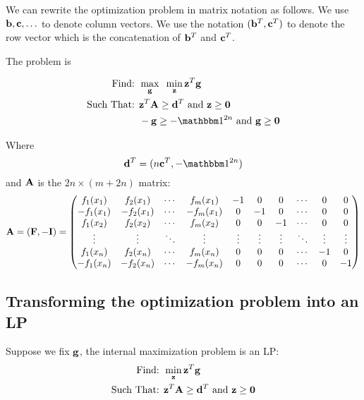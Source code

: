 \documentclass{article}[12pt]
\begin{document}
We can rewrite the optimization problem in matrix notation as follows.
We use $\mathbf{b},\mathbf{c},\ldots$ to denote column vectors.  We use the notation
$(\mathbf{b}^T,\mathbf{c}^T)$ to denote the row vector which is the concatenation of
$\mathbf{b}^T$ and $\mathbf{c}^T$.

The problem is

\begin{eqnarray}
\mbox{Find: }&\max_{\vg} \;\; \min_{\vz} \vz^T \vg \label{max-min-prog}\\
\mbox{Such That: }& \vz^T \vA \geq \vd^T \mbox{ and } \vz \geq \vzero
\notag \\
& -\vg \geq -\ones{2n} \mbox{ and } \vg \geq \vzero \notag
\end{eqnarray}

Where 
\begin{equation}
\vd^T = (n \vc^T, -\ones{2n})
\end{equation}
and $\mathbf{A}$ is the  $2n \times (m+2n)$ matrix: 
\begin{equation}
\mathbf{A} = \left( \mathbf{F}, -\mathbf{I} \right) =
 \begin{pmatrix}
   f_1(x_1) &  f_2(x_1) & \cdots &  f_m(x_1) & -1 & 0 & 0 & \cdots & 0
   & 0 \\
  -f_1(x_1) & -f_2(x_1) & \cdots & -f_m(x_1) & 0 & -1 & 0 & \cdots & 0
  & 0 \\
   f_1(x_2) &  f_2(x_2) & \cdots &  f_m(x_2) & 0 & 0 & -1 & \cdots & 0
   & 0 \\
  \vdots   & \vdots    & \ddots &  \vdots  & \vdots & \vdots & \vdots
  & \ddots & \vdots & \vdots \\
   f_1(x_n)  &  f_2(x_n)  & \cdots &   f_m(x_n) & 0  & 0 & 0 & \cdots
   & -1 & 0 \\
  -f_1(x_n)  & -f_2(x_n)  & \cdots &  -f_m(x_n) & 0  & 0 & 0 & \cdots
  & 0 & -1 \\
 \end{pmatrix}
\end{equation}

\subsection{Transforming the optimization problem into an LP}

Suppose we fix $\mathbf{g}$, the internal maximization problem is an LP:
\begin{eqnarray}
\mbox{Find: }&\min_{\mathbf{z}} \mathbf{z}^T \mathbf{g} \label{min-LP}\\
\mbox{Such That: }& \mathbf{z}^T \mathbf{A} \geq \mathbf{d}^T \mbox{ and } \mathbf{z} \geq \mathbf{0} \notag
\end{eqnarray}
\end{document}
